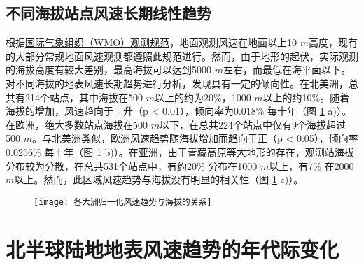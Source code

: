 \subsection{不同海拔站点风速长期线性趋势}

根据\href{https://community.wmo.int/activity-areas/imop/cimo-guide/cimo-guide-preliminary-2018-edition}{国际气象组织（WMO）观测规范}，地面观测风速在地面以上10 $m$高度，现有的大部分常规地面风速观测都遵照此规范进行。然而，由于地形的起伏，实际观测的海拔高度有较大差别，最高海拔可以达到5000 $m$左右，而最低在海平面以下。对不同海拔的地表风速长期趋势进行分析，发现具有一定的倾向性。在北美洲，总共有214个站点，其中海拔在500 $m$以上的约为20\%，1000 $m$以上的约10\%。随着海拔的增加，风速趋向于上升（p < 0.01），倾向率为0.018\% 每十年（图 \ref{fig:regionalwindvselevation} a)）。在欧洲，绝大多数站点海拔在500 $m$以下，在总共224个站点中仅有9个海拔超过500 $m$。与北美洲类似，欧洲风速趋势随海拔增加而趋向于正（p < 0.05），倾向率0.0256\% 每十年（图 \ref{fig:regionalwindvselevation} b)）。在亚洲，由于青藏高原等大地形的存在，观测站海拔分布较为分散，在总共531个站点中，有约20\% 分布在1000 $m$以上，有7\% 在2000 $m$以上。然而，此区域风速趋势与海拔没有明显的相关性（图 \ref{fig:regionalwindvselevation} c)）。

\begin{figure}[!ht]
    \centering
    \texttt{[image: 各大洲归一化风速趋势与海拔的关系]}
    \label{fig:regionalwindvselevation}
\end{figure}

\section{北半球陆地地表风速趋势的年代际变化}

